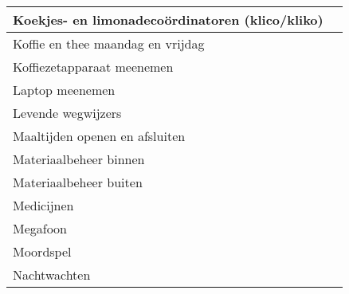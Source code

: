 \documentclass{takenlijst}
\begin{document}
\begin{center}
\begin{small}
\begin{tabular}{|l|l|}
\hline
Koekjes- en limonadeco\"ordinatoren (klico/kliko) & \\
\hline
Koffie en thee maandag en vrijdag & \\
\hline
Koffiezetapparaat meenemen & \\
\hline
Laptop meenemen & \\
\hline
Levende wegwijzers & \\
\hline
Maaltijden openen en afsluiten & \\
\hline
Materiaalbeheer binnen & \\
\hline
Materiaalbeheer buiten & \\
\hline
Medicijnen & \\
\hline
Megafoon & \\
\hline
Moordspel & \\
\hline
Nachtwachten & \\
\hline
\end{tabular}


\end{small}
\end{center}
\end{document}
